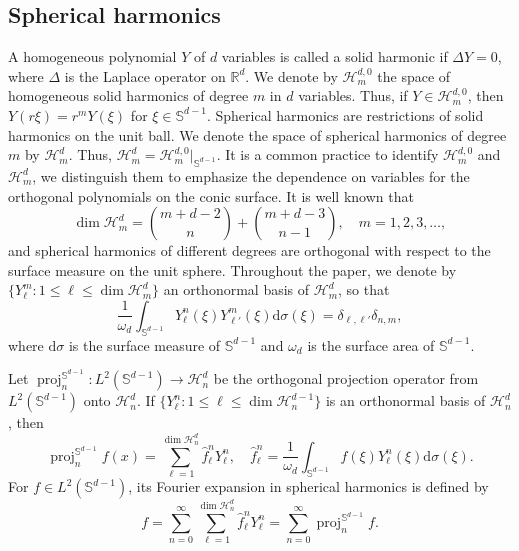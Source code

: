 \documentclass{amsart}
\theoremstyle{remark}
\def\d{\mathrm{d}}
\def\sph{{\mathbb{S}^{d-1}}}
\def\o{{\omega}}
\def\s{\sigma}
\def\CH{{\mathcal H}}
\def\RR{{\mathbb R}}
\def\proj{\operatorname{proj}}
\begin{document}
\subsection{Spherical harmonics}
A homogeneous polynomial $Y$ of $d$ variables is called a solid harmonic if $\Delta Y =0$, where $\Delta$
is the Laplace operator on $\RR^d$. We denote by $\CH_m^{d,0}$ the space of homogeneous solid
harmonics of degree $m$ in $d$ variables. Thus, if $Y \in \CH_m^{d,0}$, then $Y(r \xi) = r^m Y(\xi)$ for
$\xi \in \sph$. Spherical harmonics are restrictions of solid harmonics on the unit ball. We denote the
space of spherical harmonics of degree $m$ by $\CH_m^d$. Thus, $\CH_m^d = \CH_m^{d,0} \vert_\sph$.
It is a common practice to identify $\CH_m^{d,0}$ and $\CH_m^d$, we distinguish them to emphasize the
dependence on variables for the orthogonal polynomials on the conic surface. It is well known that
$$
   \dim \CH_m^d =  \binom{m+d-2}{n}+\binom{m+d-3}{n-1},\quad m=1,2,3,\ldots,
$$
and spherical harmonics of different degrees are orthogonal with respect to the surface measure on the
unit sphere. Throughout the paper, we denote by $\{Y_\ell^m: 1 \le \ell \le \dim \CH_m^d\}$ an orthonormal
basis of $\CH_m^d$, so that
$$
  \frac{1}{\o_d} \int_\sph Y_\ell^n(\xi) Y_{\ell'}^m(\xi) \d\s (\xi) = \delta_{\ell,\ell'} \delta_{n,m},
$$
where $\d \s$ is the surface measure of $\sph$ and $\o_d$ is the surface area of $\sph$.

Let $\proj_n^\sph: L^2(\sph) \rightarrow \CH_n^d$ be the orthogonal projection operator from $L^2(\sph)$
onto $\CH_n^d$. If $\{Y_\ell^n: 1 \le \ell \le \dim \CH_n^{d-1} \}$ is an orthonormal basis of $\CH_n^d$, then
$$
  \proj_n^\sph f (x) = \sum_{\ell =1}^{\dim \CH_n^d} \hat f_{\ell}^n Y_\ell^n, \quad
   \hat f_\ell^n = \frac{1}{\o_d} \int_{\sph} f(\xi) Y_\ell^n(\xi) \d\s(\xi).
$$
For $f \in L^2(\sph)$, its Fourier expansion in spherical harmonics is defined by
$$
  f =  \sum_{n=0}^\infty \sum_{\ell =1}^{\dim \CH_n^d} \hat f_{\ell}^n Y_\ell^n =\sum_{n=0}^\infty  \proj_n^\sph f.
$$
\end{document}
